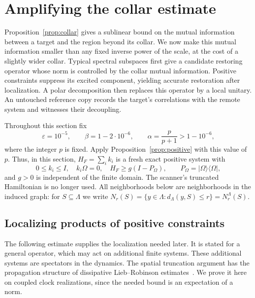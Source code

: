 \section{Amplifying the collar estimate}\label{sec:amplification}

Proposition~\ref{prop:collar} gives a sublinear bound on the mutual
information between a target and the region beyond its collar.  We now
make this mutual information smaller than any fixed inverse power of
the scale, at the cost of a slightly wider collar.  Typical spectral
subspaces first give a candidate restoring operator whose norm is
controlled by the collar mutual information.  Positive constraints
suppress its excited component, yielding accurate restoration after
localization.  A polar decomposition then replaces this operator by a
local unitary.  An untouched reference copy records the target's
correlations with the remote system and witnesses their decoupling.

Throughout this section fix
\begin{equation}\label{eq:amplification-exponents}
 \varepsilon=10^{-5},\qquad \beta=1-2\cdot10^{-6},\qquad
 \alpha=\frac{p}{p+1}>1-10^{-6},
\end{equation}
where the integer $p$ is fixed.  Apply Proposition~\ref{prop:positive}
with this value of $p$.  Thus, in this section, $H_F=\sum_i k_i$ is a
fresh exact positive system with
\begin{equation}\label{eq:amplification-positive-system}
 0\le k_i\le I,\quad k_i\Omega=0,\quad
 H_F\ge g(I-P_\Omega),\qquad
 P_\Omega=|\Omega\rangle\langle\Omega|,
\end{equation}
and $g>0$ is independent of the finite domain.  The scanner's
truncated Hamiltonian is no longer used.  All neighborhoods below are
neighborhoods in the induced graph: for $S\subseteq\Lambda$ we write
$N_r(S)=\{y\in\Lambda:d_\Lambda(y,S)\le r\}=N_r^\Lambda(S)$.

\subsection{Localizing products of positive constraints}

The following estimate supplies the localization needed later.  It is
stated for a general operator, which may act on additional finite
systems.  These additional systems are spectators in the dynamics.
The spatial truncation argument has the propagation structure of
dissipative Lieb--Robinson estimates~\cite[Theorems~1 and~2]{BarthelKliesch2012}.
We prove it here on coupled clock realizations, since the needed bound
is an expectation of a norm.

